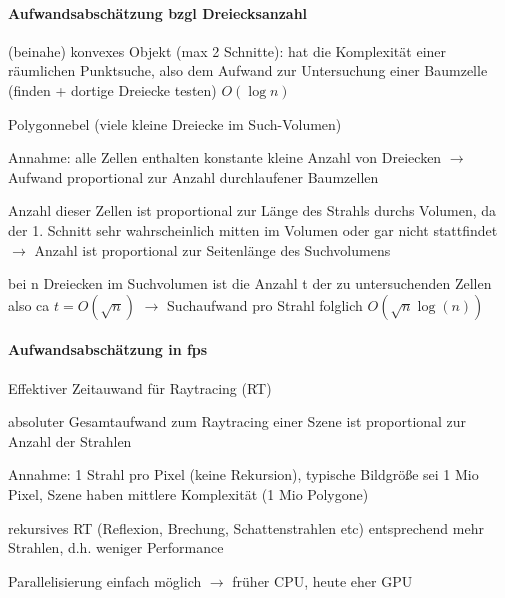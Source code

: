 \documentclass[landscape]{article}
\begin{document}
\begin{multicols}{3}
  \paragraph{Aufwandsabschätzung bzgl Dreiecksanzahl}
  \begin{enumerate*}
    \item (beinahe) konvexes Objekt (max 2 Schnitte): hat die Komplexität einer räumlichen Punktsuche, also dem Aufwand zur Untersuchung einer Baumzelle (finden + dortige Dreiecke testen) $O(\log n)$
    \item Polygonnebel (viele kleine Dreiecke im Such-Volumen)
          \begin{itemize*}
            \item Annahme: alle Zellen enthalten konstante kleine Anzahl von Dreiecken $\rightarrow$ Aufwand proportional zur Anzahl durchlaufener Baumzellen
            \item Anzahl dieser Zellen ist proportional zur Länge des Strahls durchs Volumen, da der 1. Schnitt sehr wahrscheinlich mitten im Volumen oder gar nicht stattfindet $\rightarrow$ Anzahl ist proportional zur Seitenlänge des Suchvolumens
            \item bei n Dreiecken im Suchvolumen ist die Anzahl t der zu untersuchenden Zellen also ca $t=O(\sqrt{n})$ $\rightarrow$ Suchaufwand pro Strahl folglich $O(\sqrt{n} \log (n))$
          \end{itemize*}
  \end{enumerate*}
  
  \paragraph{Aufwandsabschätzung in fps}
  \begin{itemize*}
    \item Effektiver Zeitauwand für Raytracing (RT)
    \item absoluter Gesamtaufwand zum Raytracing einer Szene ist proportional zur Anzahl der Strahlen
    \item Annahme: 1 Strahl pro Pixel (keine Rekursion), typische Bildgröße sei 1 Mio Pixel, Szene haben mittlere Komplexität (1 Mio Polygone)
    \item rekursives RT (Reflexion, Brechung, Schattenstrahlen etc) entsprechend mehr Strahlen, d.h. weniger Performance
    \item Parallelisierung einfach möglich $\rightarrow$ früher CPU, heute eher GPU
  \end{itemize*}
  

\end{multicols}
\end{document}

